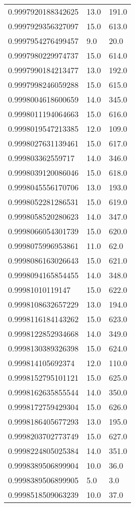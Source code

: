 \begin{center}
\begin{supertabular}[H]{p{0.30\textwidth}p{0.05\textwidth}p{0.05\textwidth}}
0.9997920188342625 & 13.0 & 191.0 \\ 
0.9997929356327097 & 15.0 & 613.0 \\ 
0.9997954276499457 & 9.0 & 20.0 \\ 
0.9997980229974737 & 15.0 & 614.0 \\ 
0.9997990184213477 & 13.0 & 192.0 \\ 
0.9997998246059288 & 15.0 & 615.0 \\ 
0.9998004618600659 & 14.0 & 345.0 \\ 
0.9998011194064663 & 15.0 & 616.0 \\ 
0.9998019547213385 & 12.0 & 109.0 \\ 
0.9998027631139461 & 15.0 & 617.0 \\ 
0.999803362559717 & 14.0 & 346.0 \\ 
0.9998039120086046 & 15.0 & 618.0 \\ 
0.9998045556170706 & 13.0 & 193.0 \\ 
0.9998052281286531 & 15.0 & 619.0 \\ 
0.9998058520280623 & 14.0 & 347.0 \\ 
0.9998066054301739 & 15.0 & 620.0 \\ 
0.9998075996953861 & 11.0 & 62.0 \\ 
0.9998086163026643 & 15.0 & 621.0 \\ 
0.9998094165854455 & 14.0 & 348.0 \\ 
0.99981010119147 & 15.0 & 622.0 \\ 
0.9998108632657229 & 13.0 & 194.0 \\ 
0.9998116184143262 & 15.0 & 623.0 \\ 
0.9998122852934668 & 14.0 & 349.0 \\ 
0.9998130389326398 & 15.0 & 624.0 \\ 
0.999814105692374 & 12.0 & 110.0 \\ 
0.9998152795101121 & 15.0 & 625.0 \\ 
0.9998162635855544 & 14.0 & 350.0 \\ 
0.9998172759429304 & 15.0 & 626.0 \\ 
0.9998186405677293 & 13.0 & 195.0 \\ 
0.9998203702773749 & 15.0 & 627.0 \\ 
0.9998224805025384 & 14.0 & 351.0 \\ 
0.9998389506899904 & 10.0 & 36.0 \\ 
0.9998389506899905 & 5.0 & 3.0 \\ 
0.9998518509063239 & 10.0 & 37.0 \\ 

\end{supertabular}
\end{center}
